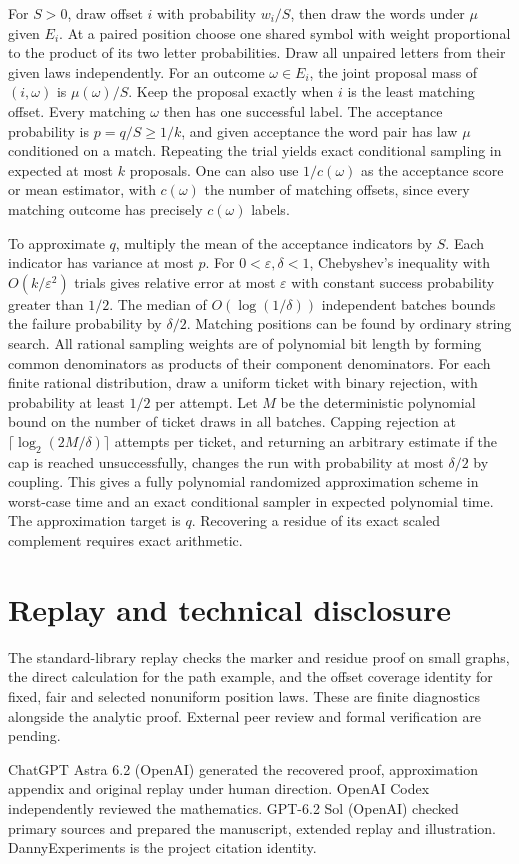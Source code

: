 \documentclass[11pt,a4paper]{amsart}
\begin{document}
For $S>0$, draw offset $i$ with probability $w_i/S$, then draw the words under $\mu$ given $E_i$. At a paired position choose one shared symbol with weight proportional to the product of its two letter probabilities. Draw all unpaired letters from their given laws independently. For an outcome $\omega\in E_i$, the joint proposal mass of $(i,\omega)$ is $\mu(\omega)/S$. Keep the proposal exactly when $i$ is the least matching offset. Every matching $\omega$ then has one successful label. The acceptance probability is $p=q/S\ge1/k$, and given acceptance the word pair has law $\mu$ conditioned on a match. Repeating the trial yields exact conditional sampling in expected at most $k$ proposals. One can also use $1/c(\omega)$ as the acceptance score or mean estimator, with $c(\omega)$ the number of matching offsets, since every matching outcome has precisely $c(\omega)$ labels.

To approximate $q$, multiply the mean of the acceptance indicators by $S$. Each indicator has variance at most $p$. For $0<\varepsilon,\delta<1$, Chebyshev's inequality with $O(k/\varepsilon^2)$ trials gives relative error at most $\varepsilon$ with constant success probability greater than $1/2$. The median of $O(\log(1/\delta))$ independent batches bounds the failure probability by $\delta/2$. Matching positions can be found by ordinary string search. All rational sampling weights are of polynomial bit length by forming common denominators as products of their component denominators. For each finite rational distribution, draw a uniform ticket with binary rejection, with probability at least $1/2$ per attempt. Let $M$ be the deterministic polynomial bound on the number of ticket draws in all batches. Capping rejection at $\lceil\log_2(2M/\delta)\rceil$ attempts per ticket, and returning an arbitrary estimate if the cap is reached unsuccessfully, changes the run with probability at most $\delta/2$ by coupling. This gives a fully polynomial randomized approximation scheme in worst-case time and an exact conditional sampler in expected polynomial time. The approximation target is $q$. Recovering a residue of its exact scaled complement requires exact arithmetic.

\section*{Replay and technical disclosure}
The standard-library replay checks the marker and residue proof on small graphs, the direct calculation for the path example, and the offset coverage identity for fixed, fair and selected nonuniform position laws. These are finite diagnostics alongside the analytic proof. External peer review and formal verification are pending.

ChatGPT Astra 6.2 (OpenAI) generated the recovered proof, approximation appendix and original replay under human direction. OpenAI Codex independently reviewed the mathematics. GPT-6.2 Sol (OpenAI) checked primary sources and prepared the manuscript, extended replay and illustration. DannyExperiments is the project citation identity.



\end{document}
